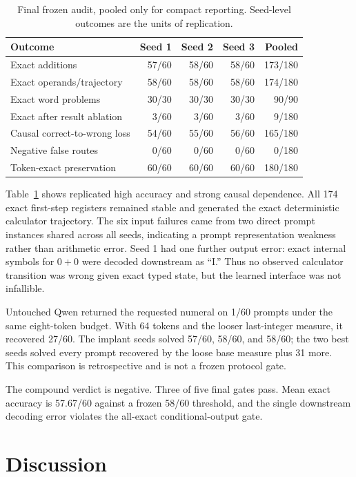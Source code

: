 \documentclass{article}
\begin{document}
\begin{table}[t]
\caption{Final frozen audit, pooled only for compact reporting. Seed-level
outcomes are the units of replication.}
\label{tab:results}
\centering
\small
\begin{tabular}{lrrrr}
\toprule
Outcome & Seed 1 & Seed 2 & Seed 3 & Pooled\\
\midrule
Exact additions & 57/60 & 58/60 & 58/60 & 173/180\\
Exact operands/trajectory & 58/60 & 58/60 & 58/60 & 174/180\\
Exact word problems & 30/30 & 30/30 & 30/30 & 90/90\\
Exact after result ablation & 3/60 & 3/60 & 3/60 & 9/180\\
Causal correct-to-wrong loss & 54/60 & 55/60 & 56/60 & 165/180\\
Negative false routes & 0/60 & 0/60 & 0/60 & 0/180\\
Token-exact preservation & 60/60 & 60/60 & 60/60 & 180/180\\
\bottomrule
\end{tabular}
\end{table}

Table~\ref{tab:results} shows replicated high accuracy and strong causal
dependence. All 174 exact first-step registers remained stable and generated
the exact deterministic calculator trajectory. The six input failures came
from two direct prompt instances shared across all seeds, indicating a prompt
representation weakness rather than arithmetic error. Seed 1 had one further
output error: exact internal symbols for $0+0$ were decoded downstream as
``I.'' Thus no observed calculator transition was wrong given exact typed
state, but the learned interface was not infallible.

Untouched Qwen returned the requested numeral on 1/60 prompts under the same
eight-token budget. With 64 tokens and the looser last-integer measure, it
recovered 27/60. The implant seeds solved 57/60, 58/60, and 58/60; the two best
seeds solved every prompt recovered by the loose base measure plus 31 more.
This comparison is retrospective and is not a frozen protocol gate.

The compound verdict is negative. Three of five final gates pass. Mean exact
accuracy is 57.67/60 against a frozen 58/60 threshold, and the single
downstream decoding error violates the all-exact conditional-output gate.

\section{Discussion}
\end{document}
